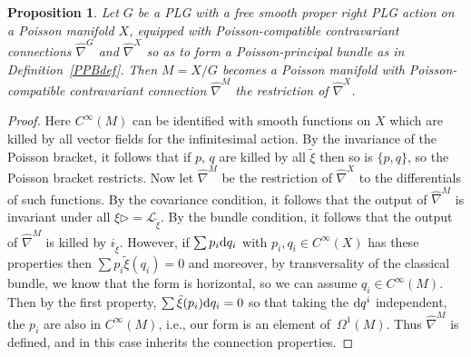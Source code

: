 \documentclass[10pt,a4paper]{amsart}
\numberwithin{equation}{section}
\newtheorem{Proposition}[Theorem]{Proposition}
 { \theoremstyle{definition}
\newtheorem{Definition}[Theorem]{Definition}
\newtheorem{Example}[Theorem]{Example}
\newtheorem{Remark}[Theorem]{Remark} }
\newcommand{\<}{{\langle}}
\renewcommand{\>}{{\rangle}}
\newcommand{\CL}{{\mathcal{L}}}
\newcommand{\extd}{{\rm d}}
\newcommand{\la}{{\triangleright}}
\begin{document}
\begin{Proposition}\label{basecalc} Let $G$ be a PLG with a free smooth proper right PLG action on a Poisson manifold $X$, equipped with Poisson-compatible contravariant connections $\hat\nabla^G$ and $\hat\nabla^X$ so as to form a Poisson-principal bundle as in Definition~{\rm \ref{PPBdef}}. Then $M=X/G$ becomes a Poisson manifold with Poisson-compatible contravariant connection $\hat\nabla^M$ the restriction of $\hat\nabla^X$.
\end{Proposition}
\begin{proof} Here $C^\infty(M)$ can be identified with smooth functions on $X$ which are killed by all vector fields for the infinitesimal action. By the invariance of the Poisson bracket, it follows that if $p$, $q$ are killed by all $\tilde\xi$ then so is $\{p,q\}$, so the Poisson bracket restricts. Now let $\hat\nabla^M$ be the restriction of $\hat\nabla^X$ to the differentials of such functions. By the covariance condition, it follows that the output of $\hat\nabla^M$ is invariant under all $\xi\la=\CL_{\tilde\xi}$. By the bundle condition, it follows that the output of $\hat\nabla^M$ is killed by $i_{\tilde\xi}$. However, if $\sum p_i\extd q_i$ with $p_i,q_i\in C^\infty(X)$ has these properties then $\sum p_i\tilde{\xi}(q_i)=0$ and moreover, by transversality of the classical bundle, we know that the form is horizontal, so we can assume $q_i\in C^\infty(M)$. Then by the first property, $\sum\tilde\xi(p_i)\extd q_i=0$ so that taking the $\extd q^i$ independent, the $p_i$ are also in $C^\infty(M)$, i.e., our form is an element of~$\Omega^1(M)$. Thus $\hat\nabla^M$ is defined, and in this case inherits the connection properties. \end{proof}
\end{document}
